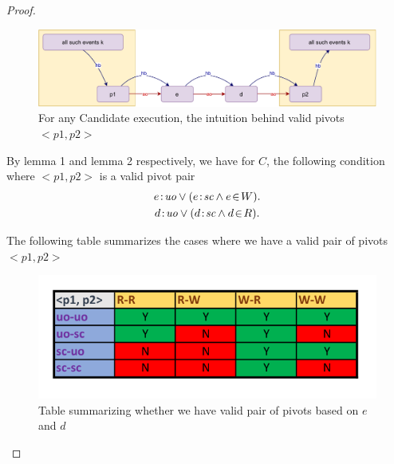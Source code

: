 \begin{proof}
        \begin{figure}[H]
            \centering
            \includegraphics[scale=0.7]{Q1(d).pdf}
            \caption{For any Candidate execution, the intuition behind valid pivots $<p1,p2>$}
            \label{fig:my_label}
        \end{figure}
        
        By lemma 1 and lemma 2 respectively, we have for $C$, the following condition where $<p1, p2>$ is a valid pivot pair
        \begin{gather*}
            \et{e}{uo} \vee (\et{e}{sc} \wedge \event{e}{W}). \\
            \et{d}{uo} \vee (\et{d}{sc} \wedge \event{d}{R}).
        \end{gather*}
            
        The following table summarizes the cases where we have a valid pair of pivots $<p1,p2>$
        \begin{figure}[H]
            \centering
            \includegraphics[scale=0.7]{Table1_Final.pdf}
            \caption{Table summarizing whether we have valid pair of pivots based on  $e$ and $d$}
            \label{fig:my_label}
        \end{figure}
                

\end{proof}
